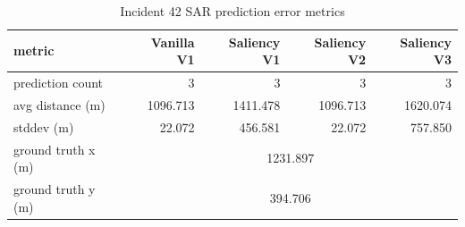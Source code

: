 \begin{table}[ht]
\centering
\caption{Incident 42 SAR prediction error metrics}
\label{tab:sar-incident-42}
\begin{tabular}{lrrrr}
\hline
metric & Vanilla V1 & Saliency V1 & Saliency V2 & Saliency V3 \\
\hline
prediction count & 3 & 3 & 3 & 3 \\
avg distance (m) & 1096.713 & 1411.478 & 1096.713 & 1620.074 \\
stddev (m) & 22.072 & 456.581 & 22.072 & 757.850 \\
ground truth x (m) & \multicolumn{4}{c}{1231.897} \\
ground truth y (m) & \multicolumn{4}{c}{394.706} \\
\hline
\end{tabular}
\end{table}
